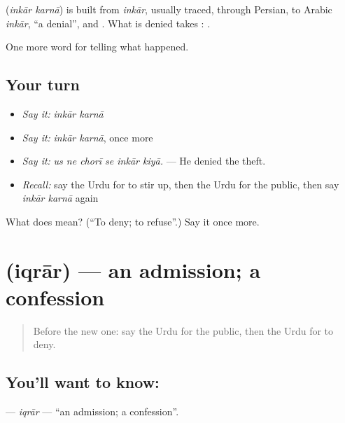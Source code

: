 \begin{cousinweb}
\textbf{ } (\emph{inkār karnā}) is built from \emph{inkār}, usually traced, through Persian, to Arabic \emph{inkār}, \textquotedblleft{}a denial\textquotedblright{}, and \textbf{}. What is denied takes \textbf{}: \textbf{   }.
\end{cousinweb}

\begin{grammarlens}[title={What you've built}]
One more word for telling what happened.
\end{grammarlens}

\subsection*{Your turn}
\begin{itemize}
\raggedright
  \item \emph{Say it:} \emph{inkār karnā}
  \item \emph{Say it:} \emph{inkār karnā}, once more
  \item \emph{Say it:} \emph{us ne chorī se inkār kiyā.} — He denied the theft.
  \item \emph{Recall:} say the Urdu for to stir up, then the Urdu for the public, then say \emph{inkār karnā} again
\end{itemize}

\begin{tcolorbox}[breakable,colback=teal!4,colframe=teal!35!black,title={Before you move on}]
What does   mean? (\textquotedblleft{}To deny; to refuse\textquotedblright{}.) Say it once more.
\end{tcolorbox}
\section[\texorpdfstring{\ur{اقرار} (iqrār)}{اقرار (iqrār)}]{ (iqrār) — an admission; a confession}

\label{lesson:UR-C303-iqrar}



\begin{quote}
Before the new one: say the Urdu for the public, then the Urdu for to deny.
\end{quote}

\subsection*{You'll want to know: }
\textbf{} — \emph{iqrār} — \textquotedblleft{}an admission; a confession\textquotedblright{}.

